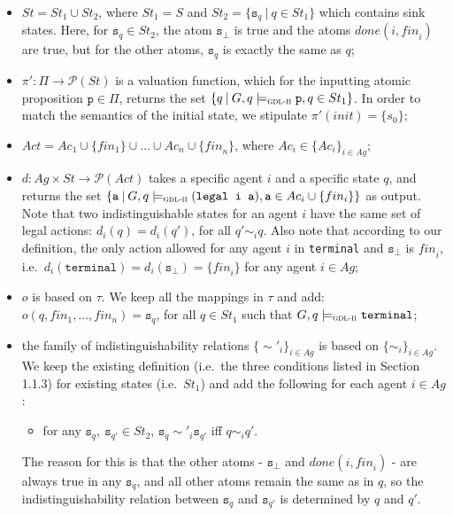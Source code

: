 \documentclass{article}
\theoremstyle{theorem}
\theoremstyle{lemma}
\theoremstyle{definition}
\theoremstyle{remark}
\begin{document}
\begin{itemize}
    \item $St= St_1 \cup St_2$, where $St_1=S$ and $St_2=\{\texttt{s}_q \:|\: q \in St_1 \}$ which contains sink states. Here, for $\texttt{s}_q \in St_2$, the atom $\texttt{s}_\bot$ is true and the atoms $done(i, \textit{fin}_i)$ are true, but for the other atoms, $\texttt{s}_q$ is exactly the same as $q$;
    \item $\pi' : \Pi \rightarrow \mathscr{P}(St)$ is a valuation function, which for the inputting atomic proposition $\texttt{p} \in \Pi$, returns the set $\{q \:|\: G,q \models_\textsc{gdl-ii} \texttt{p}, q \in St_1 \}$. In order to match the semantics of the initial state, we stipulate $\pi'(init) = \{s_0\}$;
    \item $Act=Ac_1 \cup \{fin_1\} \cup \ldots \cup Ac_n \cup \{\textit{fin}_n\}$, where $Ac_i \in \{Ac_i\}_{i \in Ag}$;
    \item $d : Ag \times St \rightarrow \mathscr{P}(Act)$ takes a specific agent $i$ and a specific state $q$, and returns the set $\{\texttt{a} \:|\: G,q \models_\textsc{gdl-ii} (\texttt{legal i a}), \texttt{a} \in Ac_i \cup \{fin_i\} \}$ as output. Note that two indistinguishable states for an agent $i$ have the same set of legal actions: $d_i(q)=d_i(q')$, for all $q' \sim_i q$. Also note that according to our definition, the only action allowed for any agent $i$ in \texttt{terminal} and $\texttt{s}_\bot$ is $\textit{fin}_i$, i.e.\ $d_i(\texttt{terminal})=d_i(\texttt{s}_\bot) = \{\textit{fin}_i \}$ for any agent $i \in Ag$;
    \item $o$ is based on $\tau$. We keep all the mappings in $\tau$ and add: $o(q,fin_1,\ldots,fin_n)= \texttt{s}_q$, for all $q \in St_1$ such that $G,q \models_\textsc{gdl-ii} \texttt{terminal}$;
    \item the family of indistinguishability relations $\{ \sim'_i \}_{i \in Ag}$ is based on $\{ \sim_i \}_{i \in Ag}$. We keep the existing definition (i.e.\ the three conditions listed in Section 1.1.3) for existing states (i.e.\ $St_1$) and add the following for each agent $i \in Ag$:
    \begin{itemize}
        \item for any $\texttt{s}_q, \: \texttt{s}_{q'} \in St_2$, $\texttt{s}_q \sim'_i \texttt{s}_{q'}$ iff $q \sim_i q'$. 
    \end{itemize}
    The reason for this is that the other atoms - $\texttt{s}_\bot$ and $done(i, \textit{fin}_i)$ - are always true in any $\texttt{s}_q$, and all other atoms remain the same as in $q$, so the indistinguishability relation between $\texttt{s}_q$ and $\texttt{s}_{q'}$ is determined by $q$ and $q'$.
\end{itemize}
\end{document}
